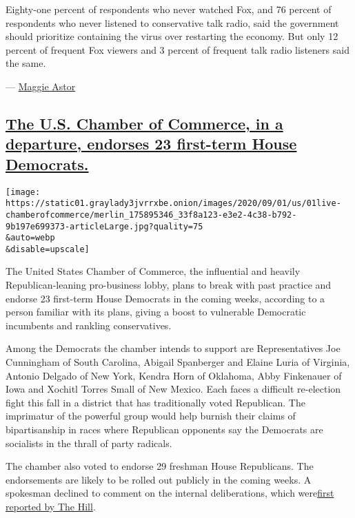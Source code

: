Eighty-one percent of respondents who never watched Fox, and 76 percent
of respondents who never listened to conservative talk radio, said the
government should prioritize containing the virus over restarting the
economy. But only 12 percent of frequent Fox viewers and 3 percent of
frequent talk radio listeners said the same.

--- \href{https://www.nytimes3xbfgragh.onion/by/maggie-astor}{Maggie
Astor}

\hypertarget{the-us-chamber-of-commerce-in-a-departure-endorses-23-first-term-house-democrats}{%
\subsection{\texorpdfstring{\protect\hyperlink{the-us-chamber-of-commerce-in-a-departure-endorses-23-first-term-house-democrats}{The
U.S. Chamber of Commerce, in a departure, endorses 23 first-term House
Democrats.}}{The U.S. Chamber of Commerce, in a departure, endorses 23 first-term House Democrats.}}\label{the-us-chamber-of-commerce-in-a-departure-endorses-23-first-term-house-democrats}}

\texttt{[image: https://static01.graylady3jvrrxbe.onion/images/2020/09/01/us/01live-chamberofcommerce/merlin\_175895346\_33f8a123-e3e2-4c38-b792-9b197e699373-articleLarge.jpg?quality=75\\\&auto=webp\\\&disable=upscale]}

The United States Chamber of Commerce, the influential and heavily
Republican-leaning pro-business lobby, plans to break with past practice
and endorse 23 first-term House Democrats in the coming weeks, according
to a person familiar with its plans, giving a boost to vulnerable
Democratic incumbents and rankling conservatives.

Among the Democrats the chamber intends to support are Representatives
Joe Cunningham of South Carolina, Abigail Spanberger and Elaine Luria of
Virginia, Antonio Delgado of New York, Kendra Horn of Oklahoma, Abby
Finkenauer of Iowa and Xochitl Torres Small of New Mexico. Each faces a
difficult re-election fight this fall in a district that has
traditionally voted Republican. The imprimatur of the powerful group
would help burnish their claims of bipartisanship in races where
Republican opponents say the Democrats are socialists in the thrall of
party radicals.

The chamber also voted to endorse 29 freshman House Republicans. The
endorsements are likely to be rolled out publicly in the coming weeks. A
spokesman declined to comment on the internal deliberations, which
were\href{https://slack-redir.net/link?url=https\%3A\%2F\%2Fthehill.com\%2Fbusiness-a-lobbying\%2Fbusiness-a-lobbying\%2F514528-us-chamber-of-commerce-set-to-endorse-23-house}{first
reported by The Hill}.

